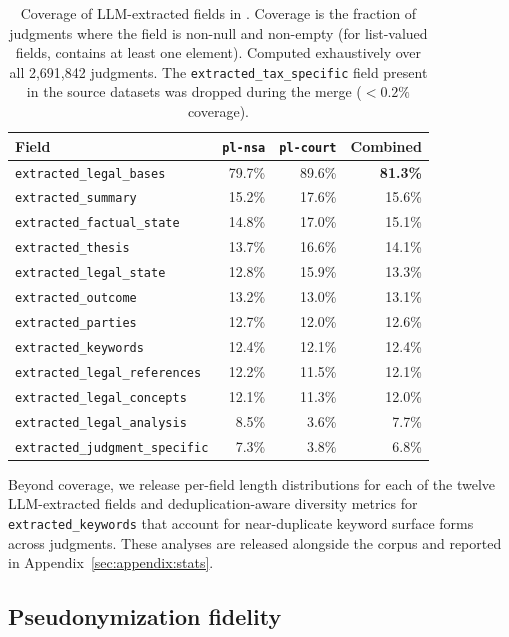 \begin{table}[h]
\centering
\small
\begin{tabular}{lrrr}
\toprule
\textbf{Field} & \textbf{\texttt{pl-nsa}} & \textbf{\texttt{pl-court}} & \textbf{Combined} \\
\midrule
\texttt{extracted\_legal\_bases}        & 79.7\% & 89.6\% & \textbf{81.3\%} \\
\texttt{extracted\_summary}             & 15.2\% & 17.6\% & 15.6\% \\
\texttt{extracted\_factual\_state}      & 14.8\% & 17.0\% & 15.1\% \\
\texttt{extracted\_thesis}              & 13.7\% & 16.6\% & 14.1\% \\
\texttt{extracted\_legal\_state}        & 12.8\% & 15.9\% & 13.3\% \\
\texttt{extracted\_outcome}             & 13.2\% & 13.0\% & 13.1\% \\
\texttt{extracted\_parties}             & 12.7\% & 12.0\% & 12.6\% \\
\texttt{extracted\_keywords}            & 12.4\% & 12.1\% & 12.4\% \\
\texttt{extracted\_legal\_references}   & 12.2\% & 11.5\% & 12.1\% \\
\texttt{extracted\_legal\_concepts}     & 12.1\% & 11.3\% & 12.0\% \\
\texttt{extracted\_legal\_analysis}     &  8.5\% &  3.6\% &  7.7\% \\
\texttt{extracted\_judgment\_specific}  &  7.3\% &  3.8\% &  6.8\% \\
\bottomrule
\end{tabular}
\caption{Coverage of LLM-extracted fields in \juddgespl{}. Coverage is the fraction of judgments where the field is non-null and non-empty (for list-valued fields, contains at least one element). Computed exhaustively over all 2{,}691{,}842 judgments. The \texttt{extracted\_tax\_specific} field present in the source datasets was dropped during the merge ($<\!0.2\%$ coverage).}
\label{tab:extraction-coverage}
\end{table}

Beyond coverage, we release per-field length distributions for each of the twelve LLM-extracted fields and deduplication-aware diversity metrics for \texttt{extracted\_keywords} that account for near-duplicate keyword surface forms across judgments. These analyses are released alongside the corpus and reported in Appendix~\ref{sec:appendix:stats}.

\subsection{Pseudonymization fidelity}
\label{sec:characterization:pseudonymization}

